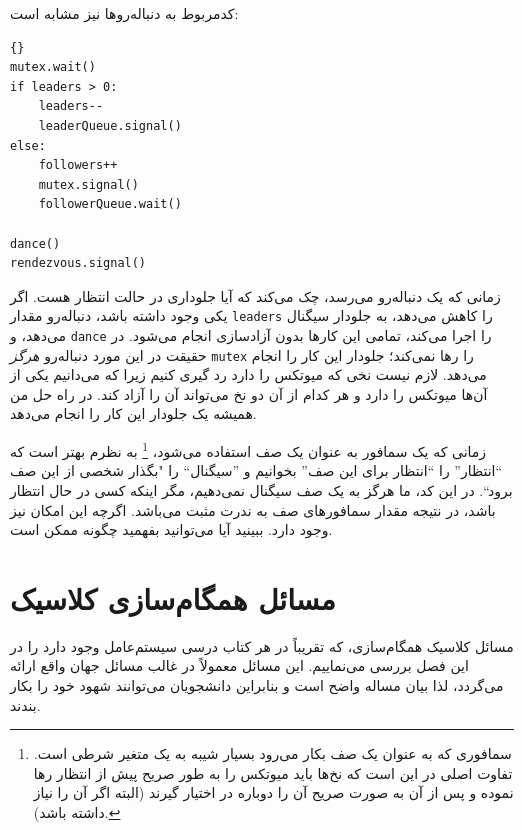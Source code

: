 \documentclass{book}
\newcommand{\clearemptydoublepage}{\newpage\cleardoublepage}
\begin{document}
    کدمربوط به دنباله‌روها نیز مشابه است:

\begin{latin}
\begin{latin}
\begin{lstlisting}[title=\rl{راه حل صف (دنباله‌روها)}]{}
mutex.wait()
if leaders > 0:
    leaders--
    leaderQueue.signal()
else:
    followers++
    mutex.signal()
    followerQueue.wait()    

dance()
rendezvous.signal()
\end{lstlisting}
\end{latin}
\end{latin}
    زمانی که یک دنباله‌رو می‌رسد، چک می‌کند که آیا جلو‌داری در حالت انتظار هست. 
    اگر یکی وجود داشته باشد، دنباله‌رو مقدار {\tt leaders} را کاهش می‌دهد، به جلودار سیگنال می‌دهد، و {\tt dance} را اجرا می‌کند، 
    تمامی این‌ کارها بدون آزادسازی  انجام می‌شود. 
    در حقیقت در این مورد دنباله‌رو {\em هرگز} {\tt mutex} را رها نمی‌کند؛‌ جلودار این کار را انجام می‌دهد. 
    لازم نیست نخی که میوتکس را دارد رد گیری کنیم زیرا که می‌دانیم یکی از آن‌ها میوتکس را دارد و هر کدام از آن دو نخ می‌تواند آن را آزاد کند. 
    در راه حل من همیشه یک جلودار این کار را انجام می‌دهد. 
    
    زمانی که یک سمافور به عنوان یک صف استفاده می‌شود، 
\footnote{
    سمافوری که به عنوان یک صف بکار می‌رود بسیار شیبه به یک متغیر شرطی است. تفاوت اصلی در این است که نخ‌ها باید میوتکس را به طور صریح 
    پیش از انتظار رها نموده و پس از آن به صورت صریح آن را دوباره در اختیار گیرند (البته اگر آن را نیاز داشته باشد). }
    به نظرم بهتر است که ``انتظار'' را ``انتظار برای این صف'' بخوانیم و ''سیگنال`` را  "بگذار شخصی از این صف برود``.
    در این کد، ما هرگز به یک صف سیگنال نمی‌دهیم، مگر اینکه کسی در حال انتظار باشد، 
    در نتیجه مقدار سمافور‌های صف به ندرت مثبت می‌باشد. اگرچه این امکان نیز وجود دارد. 
    ببینید آیا می‌توانید بفهمید چگونه ممکن است.


\clearemptydoublepage
\chapter{مسائل همگام‌سازی کلاسیک}


    مسائل کلاسیک همگام‌سازی، که تقریباً در هر کتاب درسی سیستم‌عامل وجود دارد را در این فصل بررسی می‌نماییم. 
    این مسائل معمولاً در غالب مسائل جهان واقع ارائه می‌گردد، لذا بیان مساله واضح است و بنابراین دانشجویان می‌توانند شهود خود را بکار بندند. 
    
\end{document}
